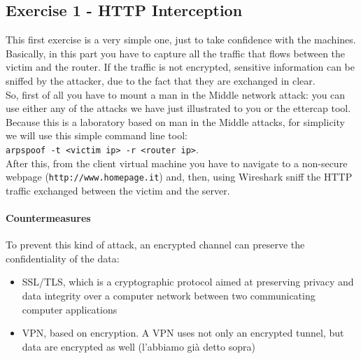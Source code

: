 \documentclass{article}
\begin{document}
\subsection{Exercise 1 - HTTP Interception}
This first exercise is a very simple one, just to take confidence with the machines. Basically, in this part you have to capture all the traffic that flows between the victim and the router. If the traffic is not encrypted, sensitive information can be sniffed by the attacker, due to the fact that they are exchanged in clear. \\
So, first of all you have to mount a man in the Middle network attack: you can use either any of the attacks we have just illustrated to you or the ettercap tool. Because this is a laboratory based on man in the Middle attacks, for simplicity we will use this simple command line tool:\\   \texttt{arpspoof -t <victim ip> -r <router ip>}. \\
After this, from the client virtual machine you have to navigate to a non-secure webpage (\texttt{http://www.homepage.it}) and, then, using Wireshark sniff the HTTP traffic exchanged between the victim and the server.
\paragraph{Countermeasures}
To prevent this kind of attack, an encrypted channel can preserve the confidentiality of the data:
\begin{itemize}
  \item SSL/TLS, which is a cryptographic protocol aimed at preserving privacy and data integrity over a computer network between two communicating computer applications  
  \item VPN, based on encryption. A VPN uses not only an encrypted tunnel, but data are encrypted as well (l'abbiamo già detto sopra)
\end{itemize}
\end{document}

